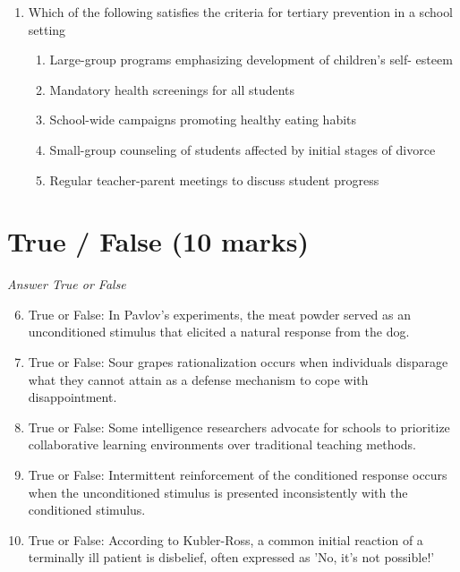\documentclass[12pt]{article}
\begin{document}
\begin{enumerate}[label=\arabic*.]
\begin{enumerate}[label=(\alph*)]
    \item rationality versus irrationality
    \item stability versus change
    \item cognition versus behavior
    \item qualitative versus quantitative data
    \item conscious versus unconscious influences
\end{enumerate}
\item Which of the following satisfies the criteria for tertiary prevention in a school setting
\begin{enumerate}[label=(\alph*)]
    \item Large-group programs emphasizing development of children's self- esteem
    \item Mandatory health screenings for all students
    \item School-wide campaigns promoting healthy eating habits
    \item Small-group counseling of students affected by initial stages of divorce
    \item Regular teacher-parent meetings to discuss student progress
\end{enumerate}
\end{enumerate}

\section*{True / False (10 marks)}
\textit{Answer True or False}
\begin{enumerate}[label=\arabic*.]
\setcounter{enumi}{5}
\item True or False: In Pavlov's experiments, the meat powder served as an unconditioned stimulus that elicited a natural response from the dog.
\item True or False: Sour grapes rationalization occurs when individuals disparage what they cannot attain as a defense mechanism to cope with disappointment.
\item True or False: Some intelligence researchers advocate for schools to prioritize collaborative learning environments over traditional teaching methods.
\item True or False: Intermittent reinforcement of the conditioned response occurs when the unconditioned stimulus is presented inconsistently with the conditioned stimulus.
\item True or False: According to Kubler-Ross, a common initial reaction of a terminally ill patient is disbelief, often expressed as 'No, it's not possible!'
\end{enumerate}
\end{document}
